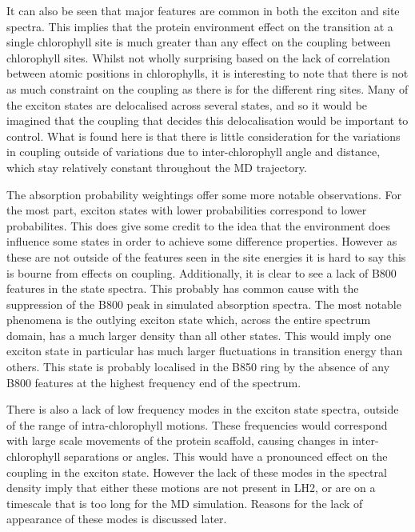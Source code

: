 It can also be seen that major features are common in both the exciton and site spectra.
This implies that the protein environment effect on the transition at a single chlorophyll
site is much greater than any effect on the coupling between chlorophyll sites.
Whilst not wholly surprising based on the lack of correlation between atomic positions
in chlorophylls, it is interesting to note that there is not as much constraint
on the coupling as there is for the different ring sites. Many of the exciton states
are delocalised across several states, and so it would be imagined that the coupling
that decides this delocalisation would be important to control. What is found here
is that there is little consideration for the variations in coupling outside of
variations due to inter-chlorophyll angle and distance, which stay relatively constant
throughout the MD trajectory.

The absorption probability weightings offer some more notable observations. For
the most part, exciton states with lower probabilities correspond to lower probabilites.
This does give some credit to the idea that the environment does influence some
states in order to achieve some difference properties. However as these are not
outside of the features seen in the site energies it is hard to say this is bourne
from effects on coupling. Additionally, it is clear to see a lack of B800 features 
in the state spectra. This probably has common cause with the suppression of the
B800 peak in simulated absorption spectra. The most notable phenomena is the outlying
exciton state which, across the entire spectrum domain, has a much larger density
than all other states. This would imply one exciton state in particular has much
larger fluctuations in transition energy than others. This state is probably localised
in the B850 ring by the absence of any B800 features at the highest frequency end
of the spectrum. 

There is also a lack of low frequency modes in the exciton state spectra, outside
of the range of intra-chlorophyll motions. These frequencies would correspond with
large scale movements of the protein scaffold, causing changes in inter-chlorophyll
separations or angles. This would have a pronounced effect on the coupling in the
exciton state. However the lack of these modes in the spectral density imply that
either these motions are not present in LH2, or are on a timescale that is too long
for the MD simulation. Reasons for the lack of appearance of these modes is discussed
later.

